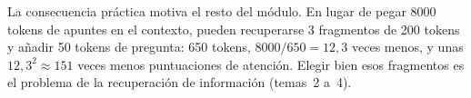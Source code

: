 La consecuencia práctica motiva el resto del módulo. En lugar de pegar 8000 tokens de apuntes en el contexto, pueden recuperarse 3 fragmentos de 200 tokens y añadir 50 tokens de pregunta: 650 tokens, $8000/650=12{,}3$ veces menos, y unas $12{,}3^{2}\approx 151$ veces menos puntuaciones de atención. Elegir bien esos fragmentos es el problema de la recuperación de información (temas~2 a~4).

